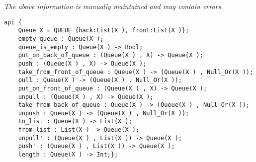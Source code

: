 \label{api:Queue}

{\tiny \it The above information is manually maintained and may contain errors.}
\begin{verbatim}
api {
    Queue X = QUEUE {back:List(X ), front:List(X )};
    empty_queue : Queue(X );
    queue_is_empty : Queue(X ) -> Bool;
    put_on_back_of_queue : (Queue(X ) , X) -> Queue(X );
    push : (Queue(X ) , X) -> Queue(X );
    take_from_front_of_queue : Queue(X ) -> (Queue(X ) , Null_Or(X ));
    pull : Queue(X ) -> (Queue(X ) , Null_Or(X ));
    put_on_front_of_queue : (Queue(X ) , X) -> Queue(X );
    unpull : (Queue(X ) , X) -> Queue(X );
    take_from_back_of_queue : Queue(X ) -> (Queue(X ) , Null_Or(X ));
    unpush : Queue(X ) -> (Queue(X ) , Null_Or(X ));
    to_list : Queue(X ) -> List(X );
    from_list : List(X ) -> Queue(X );
    unpull' : (Queue(X ) , List(X )) -> Queue(X );
    push' : (Queue(X ) , List(X )) -> Queue(X );
    length : Queue(X ) -> Int;};
\end{verbatim}
